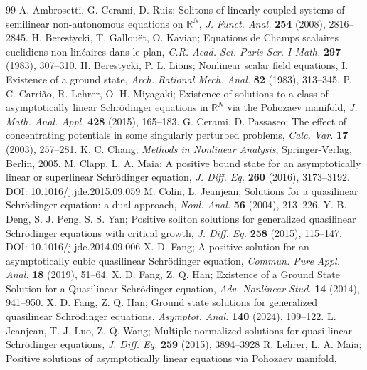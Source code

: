 \documentclass[10pt,a4paper]{amsart}
\numberwithin{equation}{section}
\begin{document}
\begin{thebibliography}{99}
  A. Ambrosetti, G. Cerami, D. Ruiz;
Solitons of linearly coupled systems of semilinear non-autonomous equations on ${\mathbb{R}^N}$, 
\emph{J. Funct. Anal. } \textbf{254} (2008), 2816–2845.
  H. Berestycki, T. Gallou\"et, O. Kavian;
Equations de Champs scalaires euclidiens non linéaires dans le plan,  
\emph{C.R. Acad. Sci. Paris Ser. I Math.} \textbf{297} (1983), 307–310.
  H. Berestycki, P. L. Lions;
Nonlinear scalar field equations, I. Existence of a ground state, 
\emph{Arch. Rational Mech. Anal.} \textbf{82}  (1983), 313–345.
  P. C. Carri\~ao, R. Lehrer, O. H. Miyagaki;
Existence of solutions to a class of asymptotically linear Schr\"odinger equations in ${\mathbb{R}^N} $ via the Pohozaev manifold, 
\emph{J. Math. Anal. Appl.} \textbf{428} (2015), 165–183.
  G. Cerami, D. Passaseo;
The effect of concentrating potentials in some singularly perturbed problems, 
\emph{Calc. Var.} \textbf{17} (2003), 257–281.
  K. C. Chang;
\emph{Methods in Nonlinear Analysis}, Springer-Verlag, Berlin, 2005.
  M. Clapp, L. A. Maia;
A positive bound state for an asymptotically linear or superlinear Schr\"odinger equation, 
\emph{J. Diff. Eq.}  \textbf{260} (2016), 3173–3192. DOI: 10.1016/j.jde.2015.09.059
  M. Colin, L. Jeanjean;
 Solutions for a quasilinear Schr\"odinger equation: a dual approach, 
 \emph{Nonl. Anal.} \textbf{56} (2004), 213--226.
  Y. B. Deng, S. J. Peng, S. S. Yan;
Positive soliton solutions for generalized quasilinear Schr\"odinger equations with critical growth, 
\emph{J. Diff. Eq.} \textbf{258} (2015), 115--147. DOI: 10.1016/j.jde.2014.09.006
  X. D. Fang;
A positive solution for an asymptotically cubic quasilinear Schr\"odinger equation, 
\emph{Commun. Pure Appl. Anal.} \textbf{18} (2019), 51--64.
  X. D. Fang, Z. Q. Han;
 Existence of a Ground State Solution for a Quasilinear Schr\"odinger equation, 
 \emph{Adv. Nonlinear Stud.} \textbf{14} (2014), 941–950.
  X. D. Fang, Z. Q. Han;
Ground state solutions for generalized quasilinear Schr\"odinger equations, 
\emph{Asymptot. Anal.} \textbf{140} (2024), 109--122.
  L. Jeanjean, T. J. Luo, Z. Q. Wang;
Multiple normalized solutions for quasi-linear Schr\"odinger equations, 
\emph{J. Diff. Eq.} \textbf{259} (2015), 3894–3928
  R. Lehrer, L. A. Maia;
Positive solutions of asymptotically linear equations via Pohozaev manifold, 

\end{thebibliography}
\end{document}
